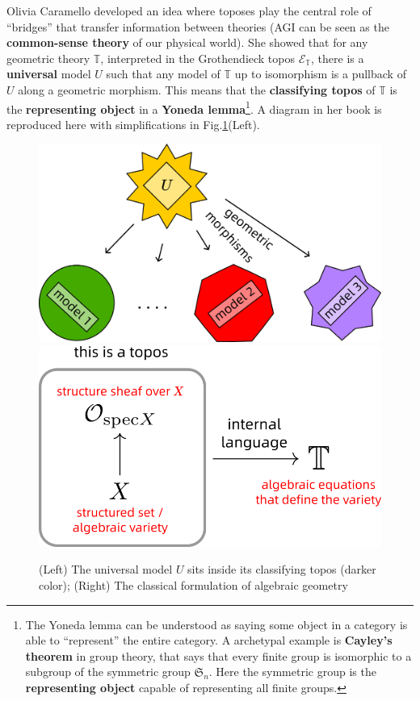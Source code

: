 \documentclass[runningheads]{llncs}
\begin{document}
Olivia Caramello \cite{Caramello2018} developed an idea where toposes play the central role of ``bridges'' that transfer information between theories (AGI can be seen as the \textbf{common-sense theory} of our physical world).  She showed that for any geometric theory $\mathbb{T}$, interpreted in the Grothendieck topos $\mathcal{E}_\mathbb{T}$, there is a \textbf{universal} model $U$ such that any model of $\mathbb{T}$ up to isomorphism is a pullback of $U$ along a geometric morphism.  This means that the \textbf{classifying topos} of $\mathbb{T}$ is the \textbf{representing object} in a \textbf{Yoneda lemma}\footnote{The Yoneda lemma can be understood as saying some object in a category is able to ``represent'' the entire category.  A archetypal example is \textbf{Cayley's theorem} in group theory, that says that every finite group is isomorphic to a subgroup of the symmetric group $\mathfrak{S}_n$. Here the symmetric group is the \textbf{representing object} capable of representing all finite groups.}.  A diagram in her book is reproduced here with simplifications in Fig.\ref{fig:Caramello-pic}(Left).

\begin{figure}
	\includegraphics[scale=.25]{Caramello-picture.png} \qquad
	\includegraphics[scale=.5]{geometric-topos.png}
	\caption{(Left) The universal model $U$ sits inside its classifying topos (darker color); (Right) The classical formulation of algebraic geometry}
	\label{fig:Caramello-pic}
\end{figure}
\end{document}
